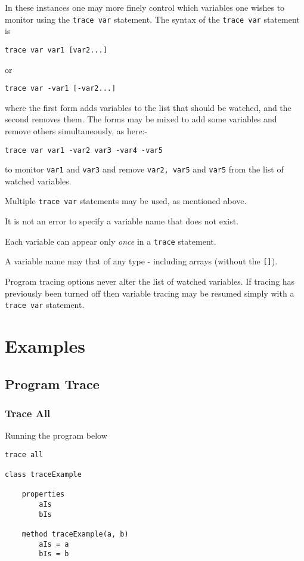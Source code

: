 {In these instances one may more finely control which variables one wishes to monitor using the \texttt{trace var} statement.
The syntax of the \texttt{trace var} statement is 
\begin{verbatim}
trace var var1 [var2...]
\end{verbatim}
or
\begin{verbatim}
trace var -var1 [-var2...]
\end{verbatim}
where the first form adds variables to the list that should be watched, and the second removes them. The forms may be mixed to add some variables and remove others simultaneously, as here:-
\begin{verbatim}
trace var var1 -var2 var3 -var4 -var5
\end{verbatim}
to  monitor \texttt{var1} and \texttt{var3} and remove \texttt{var2, var5} and \texttt{var5} from the list of watched variables. 

Multiple \texttt{trace var} statements may be used, as mentioned above.

It is not an error to specify a variable name that does not exist.

Each variable can appear only \textit{once} in a \texttt{trace} statement.

A variable name may that of any type - including arrays (without the \texttt{[]}).

Program tracing options never alter the list of watched variables. If tracing has previously been turned off then variable tracing may be resumed simply with a \texttt{trace var} statement.

\section{Examples}
\subsection{Program Trace}
\subsubsection{Trace All}
Running the program below
\begin{lstlisting}[label=Trace1, caption=Trace Example 1]
trace all

class traceExample   

	properties
		aIs
		bIs
	
	method traceExample(a, b)
		aIs = a
		bIs = b
		

\end{lstlisting}}
